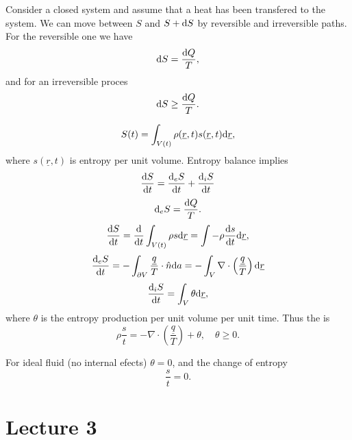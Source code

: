 \documentclass[11pt,oneside]{book}
\renewcommand{\vec}[1]{\underline{#1}}
\theoremstyle{definition} %
\theoremstyle{plain} %
\theoremstyle{remark} %
\theoremstyle{underline}
\begin{document}
  Consider a closed system and assume that a heat has been transfered to the system.
  We can move between $S$ and $S + \mathrm{d} S$ by reversible and irreversible paths.
  For the reversible one we have 
  \begin{displaymath}
    \mathrm{d} S  = \frac{\mathrm{d} Q}{T},
  \end{displaymath}
  and for an irreversible proces
  \begin{displaymath}
    \mathrm{d} S \geq \frac{\mathrm{d} Q}{T}.
  \end{displaymath}
  
  \begin{displaymath}
    S(t) = \int_{V(t)} \rho( \vec r , t) s( \vec r, t) \d \vec r,
  \end{displaymath}
  where $s(\vec r, t)$ is entropy per unit volume.
  Entropy balance implies
  \begin{displaymath}
    \frac{\mathrm{d} S}{\mathrm{d} t} = \frac{\mathrm{d}_e S}{\mathrm{d} t} + \frac{\mathrm{d}_i S}{\mathrm{d} t} 
  \end{displaymath}
  \begin{displaymath}
    \mathrm{d}_e S = \frac{\mathrm{d} Q}{T}.
  \end{displaymath}
  \begin{displaymath}
    \dfrac{S}{t} = \dfrac{}{t} \int_{V(t)} \rho s \d \vec r = \int-\rho \dfrac{s}{t} \d \vec r,
  \end{displaymath}
  \begin{displaymath}
    \dfrac{_e S}{t} = - \int_{\partial V} \frac{ \vec q}{T} \cdot \hat n \d a 
    = - \int_V \nabla \cdot \left( \frac{\vec q}{T} \right) \d \vec r
  \end{displaymath}
  \begin{displaymath}
    \dfrac{_i S}{t} = \int_V \theta \d \vec r,
  \end{displaymath}
  where $\theta$ is the entropy production per unit volume per unit time.
  Thus the  is
  \begin{displaymath}
    \rho \dfrac{s}{t} = - \nabla \cdot \left( \frac{\vec q }{T}  \right) + \theta, \quad \theta \geq 0.
  \end{displaymath}

  For ideal fluid (no internal efects) $\theta = 0$, and the change of entropy
  \begin{displaymath}
    \dfrac{s}{t} = 0.
  \end{displaymath}


  \chapter{Lecture 3}
\end{document}
